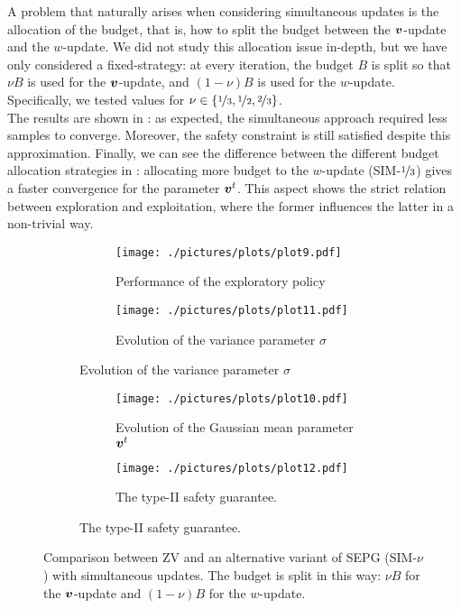 A problem that naturally arises when considering simultaneous updates is the allocation of the budget, that is, how to split the budget between the $\boldsymbol{v}$-update and the $w$-update. We did not study this allocation issue in-depth, but we have only considered a fixed-strategy: at every iteration, the budget $B$ is split so that $\nu B$ is used for the $\boldsymbol{v}$-update, and $(1-\nu)B$ is used for the $w$-update. Specifically, we tested values for $\nu \in \{\nicefrac{1}{3}, \nicefrac{1}{2}, \nicefrac{2}{3}\}$.\\
The results are shown in : as expected, the simultaneous approach required less samples to converge. Moreover, the safety constraint is still satisfied despite this approximation. Finally, we can see the difference between the different budget allocation strategies in : allocating more budget to the $w$-update (SIM-$\nicefrac{1}{3}$) gives a faster convergence for the parameter $\boldsymbol{v}^t$. This aspect shows the strict relation between exploration and exploitation, where the former influences the latter in a non-trivial way.



\begin{figure}[t]
\centering
\begin{subfigure}[t]{\textwidth}
\begin{subfigure}[t]{0.5\textwidth}
\texttt{[image: ./pictures/plots/plot9.pdf]}
\caption{Performance of the exploratory policy} \label{fig:plot3-1}
\end{subfigure}
\hfill
\begin{subfigure}[t]{0.5\textwidth}
\texttt{[image: ./pictures/plots/plot11.pdf]}
\caption{Evolution of the variance parameter $\sigma$} \label{fig:plot3-2}
\end{subfigure}
\end{subfigure}

\begin{subfigure}[t]{\textwidth}
\begin{subfigure}[t]{0.5\textwidth}
\texttt{[image: ./pictures/plots/plot10.pdf]}
\caption{Evolution of the Gaussian mean parameter $\boldsymbol{v}^t$} \label{fig:plot3-3}
\end{subfigure}
\hfill
\begin{subfigure}[t]{0.5\textwidth}
\texttt{[image: ./pictures/plots/plot12.pdf]}
\caption{The type-II safety guarantee. } \label{fig:plot3-4}
\end{subfigure}
\end{subfigure}

\caption[Comparison between ZV and SIM-$\nu$.]{Comparison between ZV and an alternative variant of SEPG (SIM-$\nu$) with simultaneous updates. The budget is split in this way: $\nu B$ for the $\boldsymbol{v}$-update and $(1-\nu)B$ for the $w$-update. }
\label{fig:plot3}
\end{figure}




